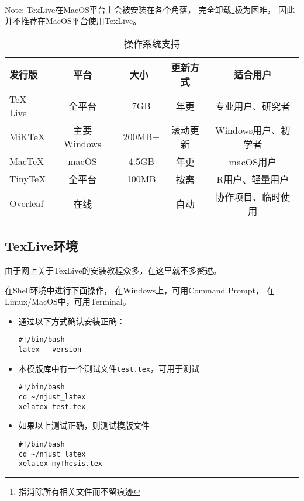 Note: TexLive在MacOS平台上会被安装在各个角落，
完全卸载\footnote{指消除所有相关文件而不留痕迹}极为困难，
因此并不推荐在MacOS平台使用TexLive。

\begin{table}[htbp]
\centering
\caption{操作系统支持}
\label{tab:sys_support}
\begin{tabular}{lcccc}
\toprule
\textbf{发行版} & \textbf{平台} & \textbf{大小} & \textbf{更新方式} & \textbf{适合用户} \\
\midrule
TeX Live & 全平台 & ~7GB & 年更 & 专业用户、研究者 \\
MiKTeX & 主要Windows & ~200MB+ & 滚动更新 & Windows用户、初学者 \\
MacTeX & macOS & ~4.5GB & 年更 & macOS用户 \\
TinyTeX & 全平台 & ~100MB & 按需 & R用户、轻量用户 \\
Overleaf & 在线 & - & 自动 & 协作项目、临时使用 \\
\bottomrule
\end{tabular}
\end{table}

\subsection{TexLive环境}

由于网上关于TexLive的安装教程众多，在这里就不多赘述。

在Shell\footnotemark 环境中进行下面操作，
在Windows上，可用Command Prompt，
在Limux/MacOS中，可用Terminal。


\begin{itemize}
    \item 通过以下方式确认安装正确：

\begin{lstlisting}[style=myshell,caption=系统管理脚本]
#!/bin/bash
latex --version
\end{lstlisting}

    \item 本模版库中有一个测试文件\texttt{test.tex}，可用于测试
    
\begin{lstlisting}[style=myshell,caption=基本测试]
#!/bin/bash
cd ~/njust_latex
xelatex test.tex
\end{lstlisting}

    \item 如果以上测试正确，则测试模版文件

\begin{lstlisting}[style=myshell,caption=模版测试]
#!/bin/bash
cd ~/njust_latex
xelatex myThesis.tex
\end{lstlisting}

\end{itemize}

